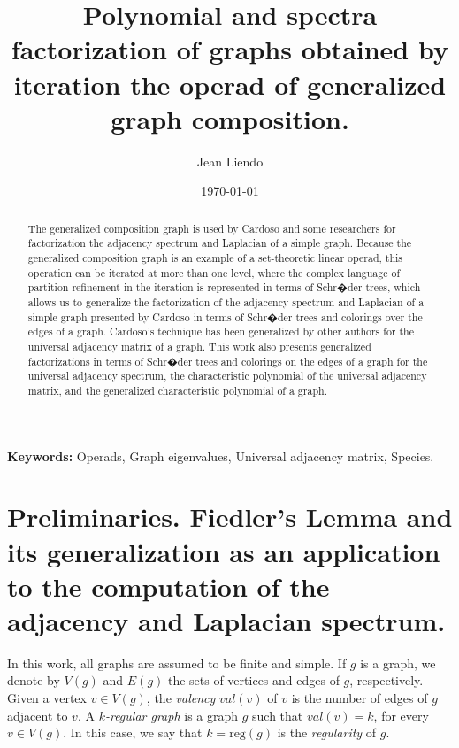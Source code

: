 \documentclass[11pt]{article}
\title{Polynomial and spectra factorization of graphs obtained by iteration the operad of generalized graph composition.}
\author{Jean Liendo}
\date{\today}
\theoremstyle{definition}
\begin{document}
\maketitle

\begin{abstract}
The generalized composition graph is used by Cardoso and some researchers for factorization the adjacency spectrum and Laplacian of a simple graph. Because the generalized composition graph is an example of a set-theoretic linear operad, this operation
can be iterated at more than one level, where the complex language of partition refinement
in the iteration is represented in terms of Schr�der trees, which allows us
to generalize the factorization of the adjacency spectrum and Laplacian of a simple graph presented
by Cardoso in terms of Schr�der trees and colorings over the edges of a graph. Cardoso's technique has been generalized by other authors for the universal adjacency matrix of a graph. This work also presents generalized factorizations in terms of Schr�der trees and colorings on the edges of a graph for the universal adjacency spectrum, the characteristic polynomial of the universal adjacency matrix, and the generalized characteristic polynomial of a graph.
\end{abstract}

\vspace{0.5cm} 
\noindent \textbf{Keywords:} Operads, Graph eigenvalues, Universal adjacency matrix, Species.
\vspace{0.5cm}

\section{Preliminaries.
Fiedler's Lemma and its generalization as an application to the computation of the adjacency and Laplacian spectrum.}

In this work, all graphs are assumed to be finite and simple. If $g$ is a graph, we denote by $V(g)$ and $E(g)$ the sets of vertices and edges of $g$, respectively. Given a vertex $v \in V(g)$, the \emph{valency} $val(v)$ of $v$ is the number of edges of $g$ adjacent to $v$. A \emph{$k$-regular graph} is a graph $g$ such that $val(v)=k$, for every $v \in V(g)$. In this case, we say that $k=\mathrm{reg}(g)$ is the \emph{regularity} of $g$.

\medbreak
\end{document}
